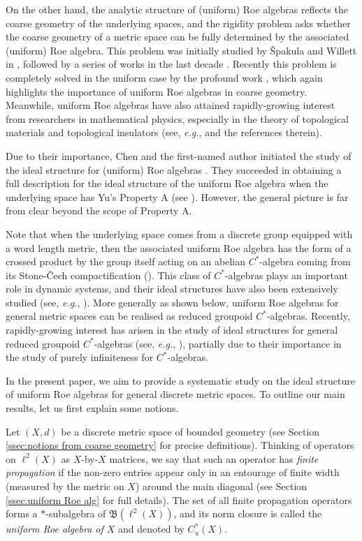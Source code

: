 \documentclass[12pt, a4paper]{amsart}
\numberwithin{equation}{section}
\theoremstyle{definition}
\theoremstyle{remark}
\def\B{\mathfrak{B}}
\begin{document}
On the other hand, the analytic structure of (uniform) Roe algebras reflects the coarse geometry of the underlying spaces, and the rigidity problem asks whether the coarse geometry of a metric space can be fully determined by the associated (uniform) Roe algebra. This problem was initially studied by \v{S}pakula and Willett in \cite{SW13}, followed by a series of works in the last decade \cite{BCL20, BF21, BFV20, BFV22, LSZ20}. Recently this problem is completely solved in the uniform case by the profound work \cite{BBFKVW22}, which again highlights the importance of uniform Roe algebras in coarse geometry. Meanwhile, uniform Roe algebras have also attained rapidly-growing interest from researchers in mathematical physics, especially in the theory of topological materials and topological insulators (see, \emph{e.g.}, \cite{EM19} and the references therein).

Due to their importance,
Chen and the first-named author initiated the study of the ideal structure for (uniform) Roe algebras \cite{CW01, CW04, CW04b, CW05, CW06, Wan07}. They succeeded in obtaining a full description for the ideal structure of the uniform Roe algebra when the underlying space has Yu's Property A (see \cite{CW04, CW05}). However, the general picture is far from clear beyond the scope of Property A.

Note that when the underlying space comes from a discrete group equipped with a word length metric, then the associated uniform Roe algebra has the form of a crossed product by the group itself acting on an abelian $C^*$-algebra coming from its Stone-\v{C}ech compactification (\cite{HR00, Oza00}). This class of $C^*$-algebras plays an important role in dynamic systems, and their ideal structures have also been extensively studied (see, \emph{e.g.}, \cite{KS19, Ren91, Sie10}). More generally as shown below, uniform Roe algebras for general metric spaces can be realised as reduced groupoid $C^*$-algebras. Recently, rapidly-growing interest has arisen in the study of ideal structures for general reduced groupoid $C^*$-algebras (see, \emph{e.g.}, \cite{BL20, BCS22, Ren91}), partially due to their importance in the study of purely infiniteness for $C^*$-algebras.


In the present paper, we aim to provide a systematic study on the ideal structure of uniform Roe algebras for general discrete metric spaces. To outline our main results, let us first explain some notions. 

Let $(X,d)$ be a discrete metric space of bounded geometry (see Section \ref{ssec:notions from coarse geometry} for precise definitions). Thinking of operators on $\ell^2(X)$ as $X$-by-$X$ matrices, we say that such an operator has \emph{finite propagation} if the non-zero entries appear only in an entourage of finite width (measured by the metric on $X$) around the main diagonal (see Section \ref{ssec:uniform Roe alg} for full details). The set of all finite propagation operators forms a $\ast$-subalgebra of $\B(\ell^2(X))$, and its norm closure is called the \emph{uniform Roe algebra of $X$} and denoted by $C^*_u(X)$. 
\end{document}

